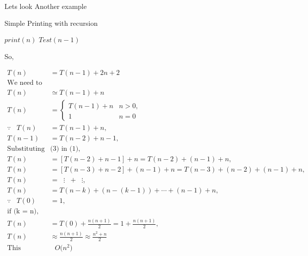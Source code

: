 \documentclass[]{article}
\begin{document}
Lets look Another example
\begin{algorithm}[H]
    \caption{Simple Printing with recursion}
    \label{printRecursion}
    \begin{algorithmic}
         
             
                \State$print(n)$ 
            \EndFor
            \State$Test(n-1)$  
        \EndIf
        \EndProcedure
    \end{algorithmic}
\end{algorithm}

So,

\[
\begin{aligned}
    T(n) &= T(n - 1) + 2n + 2\\
    \text{We need to take Asymptotic Notation}\\
    T(n) &\simeq  T(n - 1) + n\\
    T(n) &=
    \begin{cases}
        T(n - 1) + n \label{base} & n > 0, \\
        1 & n = 0
    \end{cases} \\
    \because \hspace{10pt} T(n) &= T(n - 1) + n, \\
    T(n - 1) &= T(n - 2) + n - 1, \\
    \text{Substituting} & \text{(3) in (1)}, \\
    T(n) &= [T(n - 2) + n - 1] + n = T(n - 2) + (n-1) + n, \\
    T(n) &= [T(n - 3) + n - 2] + (n-1) + n = T(n - 3) + (n-2) + (n-1) + n, \\
    T(n) &= \hspace{7pt}\vdots \hspace{7pt}+\hspace{7pt} \vdots, \\
    T(n) &= T(n - k) + (n-(k - 1 )) + \cdots + (n-1) + n, \\
    \because \hspace{10pt} T(0) &= 1, \\
    \text{if (k = n)}, \\
    T(n) &= T(0) + \frac{n(n+1)}{2} = 1 + \frac{n(n+1)}{2}, \\
    T(n) &\approx \frac{n(n+1)}{2}  \approx \frac{n^2+n}{2}\\
    \text{This algorithm is} & \text{ $O(n^2$)}
\end{aligned}
\]
\end{document}
